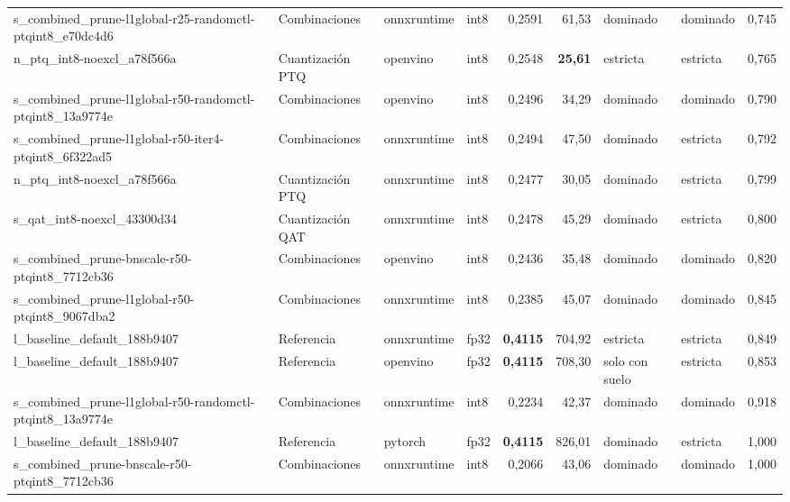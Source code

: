 \begin{landscape}
\begin{table}[htbp]
\begin{adjustbox}{max width=\linewidth, max totalheight=\dimexpr\textheight-\ht\tfmedgetitle-\dp\tfmedgetitle-\ht\tfmedgenotes-\dp\tfmedgenotes-6pt\relax}
\begin{tabular}{llllrrllr}
    s\_combined\_prune-l1global-r25-randomctl-ptqint8\_e70dc4d6 & Combinaciones & onnxruntime & int8 & 0,2591 & 61,53 & dominado & dominado & 0,745 \\
    n\_ptq\_int8-noexcl\_a78f566a & Cuantización PTQ & openvino & int8 & 0,2548 & \textbf{25,61} & estricta & estricta & 0,765 \\
    s\_combined\_prune-l1global-r50-randomctl-ptqint8\_13a9774e & Combinaciones & openvino & int8 & 0,2496 & 34,29 & dominado & dominado & 0,790 \\
    s\_combined\_prune-l1global-r50-iter4-ptqint8\_6f322ad5 & Combinaciones & onnxruntime & int8 & 0,2494 & 47,50 & dominado & estricta & 0,792 \\
    n\_ptq\_int8-noexcl\_a78f566a & Cuantización PTQ & onnxruntime & int8 & 0,2477 & 30,05 & dominado & estricta & 0,799 \\
    s\_qat\_int8-noexcl\_43300d34 & Cuantización QAT & onnxruntime & int8 & 0,2478 & 45,29 & dominado & estricta & 0,800 \\
    s\_combined\_prune-bnscale-r50-ptqint8\_7712cb36 & Combinaciones & openvino & int8 & 0,2436 & 35,48 & dominado & dominado & 0,820 \\
    s\_combined\_prune-l1global-r50-ptqint8\_9067dba2 & Combinaciones & onnxruntime & int8 & 0,2385 & 45,07 & dominado & dominado & 0,845 \\
    l\_baseline\_default\_188b9407 & Referencia & onnxruntime & fp32 & \textbf{0,4115} & 704,92 & estricta & estricta & 0,849 \\
    l\_baseline\_default\_188b9407 & Referencia & openvino & fp32 & \textbf{0,4115} & 708,30 & solo con suelo & estricta & 0,853 \\
    s\_combined\_prune-l1global-r50-randomctl-ptqint8\_13a9774e & Combinaciones & onnxruntime & int8 & 0,2234 & 42,37 & dominado & dominado & 0,918 \\
    l\_baseline\_default\_188b9407 & Referencia & pytorch & fp32 & \textbf{0,4115} & 826,01 & dominado & estricta & 1,000 \\
    s\_combined\_prune-bnscale-r50-ptqint8\_7712cb36 & Combinaciones & onnxruntime & int8 & 0,2066 & 43,06 & dominado & dominado & 1,000 \\
    \bottomrule
  \end{tabular}
  \end{adjustbox}
  \par\vspace{2pt}
  \usebox{\tfmedgenotes}
\end{table}
\end{landscape}
